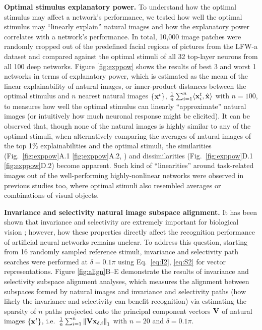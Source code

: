 \documentclass[10pt,twocolumn,letterpaper]{article}
\begin{document}
{\bf Optimal stimulus explanatory power.} To understand how the optimal stimulus may affect a network's performance, we {tested} how well the optimal stimulus may ``linearly explain'' natural images and how the explanatory power correlates with a network's performance.
In total, 10,000 image patches {were} randomly cropped out of the predefined facial regions of pictures from the LFW-a dataset \cite{wolf2011effective} and compared against the optimal stimuli of all 32 top-layer neurons from all 100 deep networks. 
Figure \ref{fig:exppow} shows the results of best 3 and worst 1 networks in terms of explanatory power, which is estimated as the mean of the linear explainability of natural images, or inner-product distances between the optimal stimulus and $n$ nearest natural images $\left\lbrace {\bf{x}}^{t} \right\rbrace$, \ie $\frac{1}{n}\sum_{i=1}^{n} \langle {\bf{x}}^{t}_{i} , \hat{{\bf{x}}} \rangle$ with $n=100$, to measures how well the optimal stimulus can linearly ``approximate'' natural images (or intuitively how much neuronal response might be elicited).
It can be observed that, though none of the natural images is highly similar to any of the optimal stimuli, when alternatively comparing the averages of natural images of the top 1\% explainabilities and the optimal stimuli, the similarities (Fig.~\ref{fig:exppow}A.1 \vs \ref{fig:exppow}A.2, \etc) and dissimilarities (Fig.~\ref{fig:exppow}D.1 \vs \ref{fig:exppow}D.2) become apparent.
Such kind of ``linearities'' around task-related images out of the well-performing highly-nonlinear networks were observed in previous studies \cite{le2012building, simonyan2013deep} too, where optimal stimuli also resembled averages or combinations of visual objects.


{\bf Invariance and selectivity \vs natural image subspace alignment.} It has been shown that invariance and selectivity are extremely important for biological vision \cite{desimone1991face, ito1995size}; however, how these properties directly affect the recognition performance of artificial neural networks remains unclear.
To address this question, starting from 16 randomly sampled reference stimuli, invariance and selectivity path searches {were} performed at $\delta = 0.1\pi$ using Eq.~\ref{eq:I2}, \ref{eq:S2} for vector representations. 
Figure \ref{fig:align}B--E demonstrate the results of invariance and selectivity subspace alignment analyses, which measures the alignment between subspaces formed by natural images and invariance and selectivity paths (\ie how likely the invariance and selectivity can benefit recognition) via estimating the sparsity of $n$ paths projected onto the principal component vectors $\bf{V}$ of natural images $\left\lbrace {\bf{x}}^{t} \right\rbrace$, i.e.~$\frac{1}{n}\sum_{i=1}^{n} \left\| {\bf{Vx}}_{\delta,i} \right\|_{1}$ with $n=20$ and $\delta=0.1\pi$.
\end{document}
